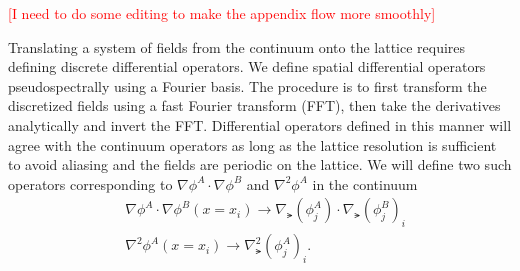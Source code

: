 


\textcolor{red}{[I need to do some editing to make the appendix flow more smoothly]}

Translating a system of fields from the continuum onto the lattice requires defining discrete differential operators.
We define spatial differential operators pseudospectrally using a Fourier basis.
The procedure is to first transform the discretized fields using a fast Fourier transform (FFT), then take the derivatives analytically and invert the FFT.
Differential operators defined in this manner will agree with the continuum operators as long as the lattice resolution is sufficient to avoid aliasing and the fields are periodic on the lattice.
We will define two such operators corresponding to $\nabla\phi^A\cdot\nabla\phi^B$ and $\nabla^2\phi^A$ in the continuum
\begin{align}
  & \nabla\phi^A\cdot\nabla\phi^B(x=x_i) \to \nabla_\lat(\phi^A_j)\cdot\nabla_\lat(\phi^B_j)_i \\
  & \nabla^2\phi^A(x=x_i) \to \nabla^2_\lat(\phi^A_j)_i.
\end{align}

